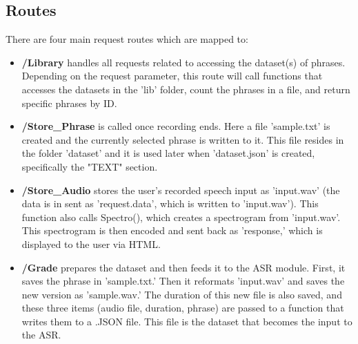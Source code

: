 \documentclass[12pt, letterpaper]{article}
\begin{document}
\subsection*{Routes}
There are four main request routes which are mapped to:
\begin{itemize}
\item{\textbf{/Library}} handles all requests related to accessing the dataset(s) of phrases. Depending on the request parameter, this route will call functions that accesses the datasets in the 'lib' folder, count the phrases in a file, and return specific phrases by ID. 
\item{\textbf{/Store\_Phrase}} is called once recording ends. Here a file 'sample.txt' is created and the currently selected phrase is written to it. This file resides in the folder 'dataset' and it is used later when 'dataset.json' is created, specifically the "TEXT" section.
\item{\textbf{/Store\_Audio}} stores the user's recorded speech input as 'input.wav' (the data is in sent as 'request.data', which is written to 'input.wav'). This function also calls Spectro(), which creates a spectrogram from 'input.wav'. This spectrogram is then encoded and sent back as 'response,' which is displayed to the user via HTML.
\item{\textbf{/Grade}} prepares the dataset and then feeds it to the ASR module. First, it saves the phrase in 'sample.txt.' Then it reformats 'input.wav' and saves the new version as 'sample.wav.' The duration of this new file is also saved, and these three items (audio file, duration, phrase) are passed to a function that writes them to a .JSON file. This file is the dataset that becomes the input to the ASR.

\end{itemize}
\end{document}
